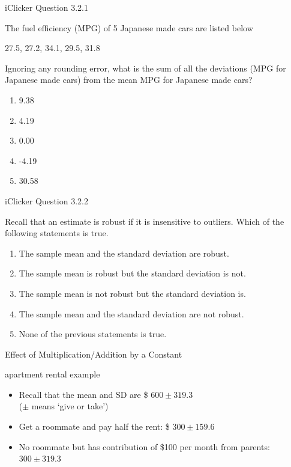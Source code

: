 \documentclass[14pt]{beamer}\usepackage[]{graphicx}\usepackage[]{color}
\begin{document}
\begin{frame}[fragile]{iClicker Question 3.2.1}

The fuel efficiency (MPG) of 5 Japanese made cars are listed below

27.5,	27.2,	34.1,	29.5,	31.8

Ignoring any rounding error, what is the sum of all the deviations (MPG  for Japanese made cars) from the mean MPG for Japanese made  cars?

\begin{enumerate}
\item 9.38
\item 4.19
\item 0.00
\item -4.19
\item 30.58
\end{enumerate}
\end{frame}

\begin{frame}[fragile]{iClicker Question 3.2.2}

Recall that an estimate is robust if it is insensitive to outliers. Which of  the following statements is true.

\begin{enumerate}
\item The sample mean and the standard deviation are robust.
\item The sample mean is robust but the standard deviation is  not.
\item The sample mean is not robust but the standard deviation  is.
\item The sample mean and the standard deviation are not  robust.
\item None of the previous statements is true.
\end{enumerate}
\end{frame}

\begin{frame}[fragile]{Effect of Multiplication/Addition by a Constant}



\begin{center}
apartment rental example
\end{center}

\begin{itemize}
\item<1-> Recall that the mean and SD are \$ $600 \pm 319.3$ \\ ($\pm$ means `give or take')
\item<2-> Get a roommate and pay half the rent: \$ $300 \pm 159.6$ %
\item<3-> No roommate but has contribution of \$100 per month from parents: $300 \pm 319.3$    %
\end{itemize}
\end{frame}
\end{document}
